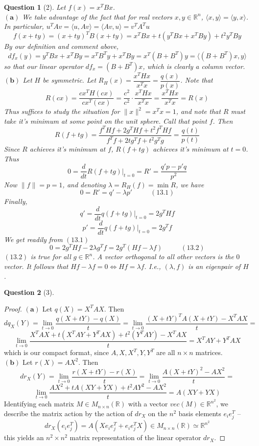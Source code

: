 \documentclass[11pt]{article}
\theoremstyle{quest}
\newtheorem*{question}{Question}
\begin{document}
\begin{question}[2]
Let $f(x) = x^TBx$.
\\$\mathbf{(a)}$ We take advantage of the fact that for real vectors $x, y \in \mathbb{R}^n$, $\langle x, y \rangle = \langle y, x \rangle$. In particular, $u^TAv = \langle u, Av \rangle = \langle Av, u \rangle = v^TA^Tu$
$$f(x + ty) = (x + ty)^TB(x + ty) = x^TBx + t(y^TBx + x^TBy)+t^2y^TBy$$
By our definition and comment above,
$$df_x(y) = y^TBx + x^TBy = x^TB^Ty + x^TBy = x^T(B + B^T)y = \langle (B + B^T)x, y \rangle$$
so that our linear operator $df_x = (B + B^T)x$, which is clearly a column vector.
\\$\mathbf{(b)}$ Let $H$ be symmetric. Let $R_H(x) = \dfrac{x^THx}{x^Tx} = \dfrac{q(x)}{p(x)}$. Note that
$$R(cx) = \dfrac{cx^TH(cx)}{cx^T(cx)} = \dfrac{c^2}{c^2} \cdot \dfrac{x^THx}{x^Tx} = \dfrac{x^THx}{x^Tx} = R(x)$$
Thus suffices to study the situation for $\|x\|^2 = x^Tx = 1$, and note that $R$ must take it's minimum at some point on the unit sphere. Call that point $f$. Then
$$R(f + tg) = \dfrac{f^THf + 2g^THf + t^2f^THf}{f^Tf + 2tg^Tf + t^2g^Tg} = \dfrac{q(t)}{p(t)}$$
Since $R$ achieves it's minimum at $f$, $R(f + tg)$ achieves it's minimum at $t=0$. Thus
$$0 = \dfrac{d}{dt}R(f + tg)|_{t=0} = R' = \dfrac{q'p - p'q}{p^2}$$
Now $\|f\| = p = 1$, and denoting $\lambda = R_H(f) = \min R$, we have
$$0 = R' = q' - \lambda p'\ \ \ \ \ \ \ \ \ \ \ \ (13.1)$$
Finally,
$$q' = \dfrac{d}{dt}q(f + tg)|_{t=0} = 2g^THf$$
$$p' = \dfrac{d}{dt}q(f + tg)|_{t=0} = 2g^Tf$$
We get readily from $(13.1)$
$$0 = 2g^THf - 2\lambda g^Tf = 2g^T(Hf - \lambda f)\ \ \ \ \ \ \ \ \ \ \ \ (13.2)$$
$(13.2)$ is true for all $g \in \mathbb{R}^n$. A vector orthogonal to all other vectors is the $0$ vector. It follows that $Hf - \lambda f = 0 \iff Hf = \lambda f$. I.e., $(\lambda, f)$ is an eigenpair of $H$.
\end{question}

\begin{question}[3]
\end{question}
\begin{proof}
$\mathbf{(a)}$ Let $q(X) = X^TAX$. Then
$$dq_X(Y) = \lim_{t \rightarrow 0} \dfrac{q(X + tY) - q(X)}{t} = \lim_{t \rightarrow 0} \dfrac{(X + tY)^TA(X + tY) - X^TAX}{t} =$$
$$\lim_{t \rightarrow 0} \dfrac{X^TAX + t(X^TAY + Y^TAX) + t^2(Y^TAY) - X^TAX}{t} = X^TAY + Y^TAX$$
which is our compact format, since $A, X, X^T, Y, Y^T$ are all $n \times n$ matrices.
\\$\mathbf{(b)}$ Let $r(X) = AX^2$. Then
$$dr_X(Y) = \lim_{t \rightarrow 0} \dfrac{r(X + tY) - r(X)}{t} = \lim_{t \rightarrow 0} \dfrac{A(X+tY)^2 - AX^2}{t} =$$
$$\lim_{t \rightarrow 0} \dfrac{AX^2 + tA(XY + YX) + t^2AY^2 - AX^2}{t} = A(XY + YX)$$
Identifying each matrix $M \in M_{n \times n}(\mathbb{R})$ with a vector $vec(M) \in \mathbb{R}^{n^2}$, we describe the matrix action by the action of $dr_X$ on the $n^2$ basis elements $e_i e_j^T$ --
$$dr_X(e_i e_j^T) = A(X e_i e_j^T + e_i e_j^T X) \in M_{n \times n}(\mathbb{R}) \simeq \mathbb{R}^{n^2}$$
this yields an $n^2 \times n^2$ matrix representation of the linear operator $dr_X$.
\end{proof}
\end{document}
